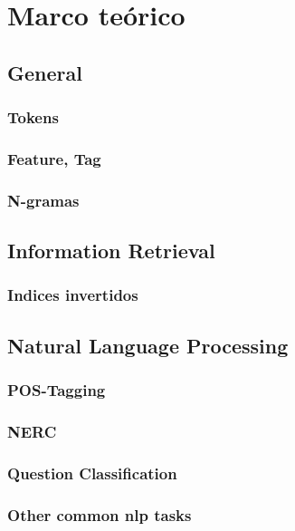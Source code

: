 \chapter{Marco teórico}
\section{General}
\subsection{Tokens}
\subsection{Feature, Tag}
\subsection{N-gramas}
\section{Information Retrieval}
\subsection{Indices invertidos}
\section{Natural Language Processing}
\subsection{POS-Tagging}
\subsection{NERC}
\subsection{Question Classification}
\subsection{Other common nlp tasks}




